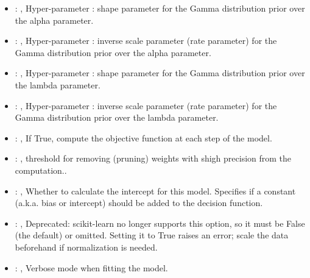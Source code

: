 \begin{itemize}
    \item {}: ,
      Hyper-parameter : shape parameter for the Gamma
      distribution prior over the alpha parameter.

    \item {}: ,
      Hyper-parameter : inverse scale parameter (rate parameter)
      for the Gamma distribution prior over the alpha parameter.

    \item {}: ,
      Hyper-parameter : shape parameter for the Gamma distribution
      prior over the lambda parameter.

    \item {}: ,
      Hyper-parameter : inverse scale parameter (rate parameter) for
      the Gamma distribution prior over the lambda parameter.

    \item {}: ,
      If True, compute the objective function at each step of the
      model.

    \item {}: ,
      threshold for removing (pruning) weights with
      shigh precision from the computation..

    \item {}: ,
      Whether to calculate the intercept for this model. Specifies if a constant (a.k.a. bias or
      intercept)                                                   should be added to the decision
      function.

    \item {}: ,
      Deprecated: scikit-learn no longer supports this option, so it must be False (the default) or
      omitted.                                                  Setting it to True raises an error;
      scale the data beforehand if normalization is needed.

    \item {}: ,
      Verbose mode when fitting the model.
  \end{itemize}


